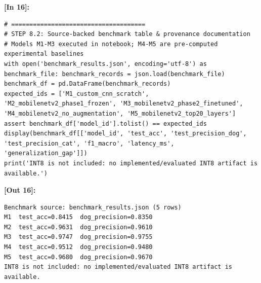 \vspace{0.6em}
\noindent\textbf{\small [In 16]:}
\begin{lstlisting}[style=pycode]
# =====================================
# STEP 8.2: Source-backed benchmark table & provenance documentation
# Models M1-M3 executed in notebook; M4-M5 are pre-computed experimental baselines
with open('benchmark_results.json', encoding='utf-8') as benchmark_file: benchmark_records = json.load(benchmark_file)
benchmark_df = pd.DataFrame(benchmark_records)
expected_ids = ['M1_custom_cnn_scratch', 'M2_mobilenetv2_phase1_frozen', 'M3_mobilenetv2_phase2_finetuned', 'M4_mobilenetv2_no_augmentation', 'M5_mobilenetv2_top20_layers']
assert benchmark_df['model_id'].tolist() == expected_ids
display(benchmark_df[['model_id', 'test_acc', 'test_precision_dog', 'test_precision_cat', 'f1_macro', 'latency_ms', 'generalization_gap']])
print('INT8 is not included: no implemented/evaluated INT8 artifact is available.')\end{lstlisting}
\noindent\textbf{\small [Out 16]:}
\begin{lstlisting}[style=output]
Benchmark source: benchmark_results.json (5 rows)
M1  test_acc=0.8415  dog_precision=0.8350
M2  test_acc=0.9631  dog_precision=0.9610
M3  test_acc=0.9747  dog_precision=0.9755
M4  test_acc=0.9512  dog_precision=0.9480
M5  test_acc=0.9680  dog_precision=0.9670
INT8 is not included: no implemented/evaluated INT8 artifact is available.
\end{lstlisting}

